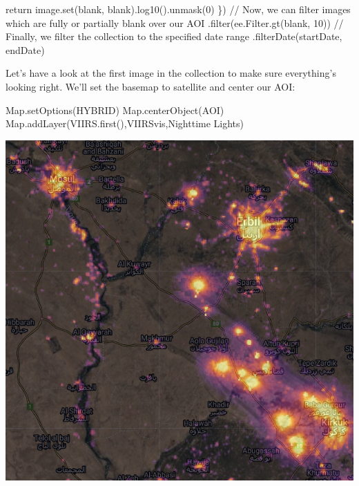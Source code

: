 \documentclass[
  letterpaper,
  DIV=11,
  numbers=noendperiod]{scrreprt}
\newenvironment{Shaded}{\begin{snugshade}}{\end{snugshade}}
\newcommand{\AttributeTok}[1]{\textcolor[rgb]{0.40,0.45,0.13}{#1}}
\newcommand{\BuiltInTok}[1]{\textcolor[rgb]{0.00,0.23,0.31}{#1}}
\newcommand{\CommentTok}[1]{\textcolor[rgb]{0.37,0.37,0.37}{#1}}
\newcommand{\ControlFlowTok}[1]{\textcolor[rgb]{0.00,0.23,0.31}{#1}}
\newcommand{\DecValTok}[1]{\textcolor[rgb]{0.68,0.00,0.00}{#1}}
\newcommand{\FunctionTok}[1]{\textcolor[rgb]{0.28,0.35,0.67}{#1}}
\newcommand{\NormalTok}[1]{\textcolor[rgb]{0.00,0.23,0.31}{#1}}
\newcommand{\OperatorTok}[1]{\textcolor[rgb]{0.37,0.37,0.37}{#1}}
\newcommand{\StringTok}[1]{\textcolor[rgb]{0.13,0.47,0.30}{#1}}
\begin{document}
\begin{Shaded}
\begin{Highlighting}[]
                    \ControlFlowTok{return}\NormalTok{ image}\OperatorTok{.}\FunctionTok{set}\NormalTok{(}\StringTok{\textquotesingle{}blank\textquotesingle{}}\OperatorTok{,}\NormalTok{ blank)}\OperatorTok{.}\FunctionTok{log10}\NormalTok{()}\OperatorTok{.}\FunctionTok{unmask}\NormalTok{(}\DecValTok{0}\NormalTok{)}
\NormalTok{                    \})}
                    \CommentTok{// Now, we can filter images which are fully or partially blank over our AOI}
                    \OperatorTok{.}\FunctionTok{filter}\NormalTok{(ee}\OperatorTok{.}\AttributeTok{Filter}\OperatorTok{.}\FunctionTok{gt}\NormalTok{(}\StringTok{\textquotesingle{}blank\textquotesingle{}}\OperatorTok{,} \DecValTok{10}\NormalTok{))}
                    \CommentTok{// Finally, we filter the collection to the specified date range}
                    \OperatorTok{.}\FunctionTok{filterDate}\NormalTok{(startDate}\OperatorTok{,}\NormalTok{ endDate)}
                    
\end{Highlighting}
\end{Shaded}

Let's have a look at the first image in the collection to make sure
everything's looking right. We'll set the basemap to satellite and
center our AOI:

\begin{Shaded}
\begin{Highlighting}[]
\BuiltInTok{Map}\OperatorTok{.}\FunctionTok{setOptions}\NormalTok{(}\StringTok{\textquotesingle{}HYBRID\textquotesingle{}}\NormalTok{)}
\BuiltInTok{Map}\OperatorTok{.}\FunctionTok{centerObject}\NormalTok{(AOI)}
\BuiltInTok{Map}\OperatorTok{.}\FunctionTok{addLayer}\NormalTok{(VIIRS}\OperatorTok{.}\FunctionTok{first}\NormalTok{()}\OperatorTok{,}\NormalTok{VIIRSvis}\OperatorTok{,}\StringTok{\textquotesingle{}Nighttime Lights\textquotesingle{}}\NormalTok{)}
\end{Highlighting}
\end{Shaded}

\includegraphics{././images/iraq_check.png}
\end{document}
